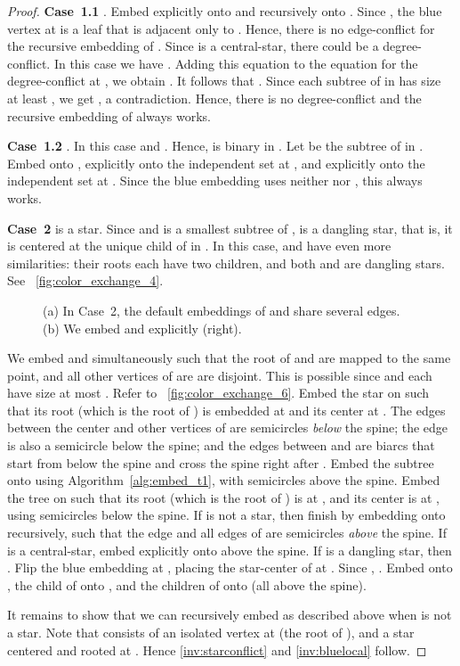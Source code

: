 \documentclass[11pt,a4paper,colorlinks=true,urlcolor=blue,citecolor=red]{article}
\theoremstyle{plain}
\newcommand{\case}[1]{\par\vspace{.5\baselineskip}\noindent\textbf{\sffamily Case~#1}}
\begin{document}
\begin{proof}
\case{1.1} . Embed  explicitly onto  and 
recursively onto . Since , the blue vertex at  is a
leaf that is adjacent only to . Hence, there is no edge-conflict
for the recursive embedding of . Since  is a
central-star, there could be a degree-conflict. In this case we have
. Adding this equation to the
equation for the degree-conflict at , we obtain
.
It follows that . Since each subtree of 
in  has size at least , we get
, a
contradiction. Hence, there is no degree-conflict and the recursive
embedding of  always works.

\case{1.2} . In this case  and .
Hence,  is binary in . Let  be the subtree of  in
. Embed  onto ,  explicitly onto the independent set at
, and  explicitly onto the independent set at .
Since the blue embedding uses neither  nor , this
always works.

\case{2}  is a star. Since  and  is a smallest subtree
of ,  is a dangling star, that is, it is centered at the unique
child  of  in . In this case,  and  have even more similarities:
their roots each have two children, and both  and  are dangling stars.
See \figurename~\ref{fig:color_exchange_4}.

\begin{figure}[htbp]
  \centering
  \hfil {}\hfil \caption{(a) In Case~2, the default embeddings of  and  share
    several edges. (b) We embed  and  explicitly
    (right).\label{fig:color_exchange_again} }
\end{figure}

We embed  and  simultaneously such that the root of  and 
are mapped to the same point, and all other vertices of  are 
are disjoint. This is possible since  and  each have size at
most . Refer to \figurename~\ref{fig:color_exchange_6}. Embed
the star  on  such
that its root (which is the root of ) is embedded at  and its center at .
The edges between the center  and other vertices of  are
semicircles \emph{below} the spine; the edge  is also a semicircle below the spine;
and the edges between  and  are biarcs that start from  below the
spine and cross the spine right after .
Embed the subtree  onto 
using Algorithm~\ref{alg:embed_t1}, with semicircles above the spine.
Embed the tree  on  such that its root (which is the root of )
is at , and its center is at , using semicircles below the spine.
If  is not a star, then finish by embedding  onto 
recursively, such that the edge  and all edges of  are
semicircles \emph{above} the spine.
If  is a central-star, embed  explicitly onto  above
the spine. If  is a dangling star, then . Flip the blue
embedding at , placing the star-center of  at
. Since , . Embed  onto
, the child  of  onto , and the children of  onto
 (all above the spine).

It remains to show that we can recursively embed  as described above
when  is not a star.
Note that  consists of an isolated vertex at  (the
root of ), and a star  centered and rooted at
. Hence \ref{inv:starconflict} and \ref{inv:bluelocal} follow.
\end{proof}
\end{document}
